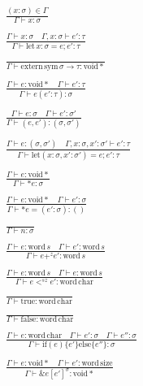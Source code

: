 \documentclass {article}
\begin{document}
\begin{gather*}
\frac
{(x : \sigma) \in \Gamma}
{\Gamma \vdash x : \sigma} \\
\\
\frac
{\Gamma \vdash x : \sigma \quad \Gamma, x : \sigma \vdash e' : \tau }
{\Gamma \vdash \text{let} \, x : \sigma = e; e' : \tau} \\
\\
\frac
{}
{\Gamma \vdash \text{extern} \, \text{sym} \, \sigma \to \tau : \text{void} *} \\
\\
\frac
{\Gamma \vdash e : \text{void} * \quad \Gamma \vdash e' : \tau}
{\Gamma \vdash e(e' : \tau) : \sigma} \\
\\
\frac
{\Gamma \vdash e : \sigma \quad \Gamma \vdash e' : \sigma'}
{\Gamma \vdash (e, e') : (\sigma, \sigma') } \\
\\
\frac
{\Gamma \vdash e : (\sigma, \sigma') \quad \Gamma, x : \sigma, x' : \sigma' \vdash e' : \tau}
{\Gamma \vdash \text{let} (x: \sigma, x' : \sigma') = e; e' : \tau} \\
\\
\frac
{\Gamma \vdash e : \text{void} *}
{\Gamma \vdash * e : \sigma} \\
\\
\frac {\Gamma \vdash e : \text{void} * \quad \Gamma \vdash e' : \sigma}
{\Gamma \vdash *e = (e' : \sigma) : ()} \\
\\
\frac
{}
{\Gamma \vdash n : \sigma} \\
\\
\frac
{\Gamma \vdash e : \text{word} \, s \quad \Gamma \vdash e' : \text{word} \, s }
{\Gamma \vdash e +^z e' : \text{word} \, s} \\
\\
\frac
{\Gamma \vdash e : \text{word} \, s \quad \Gamma \vdash e : \text{word} \, s}
{\Gamma \vdash e <^{sz} e' : \text{word} \, \text{char}} \\
\\
\frac
{}
{\Gamma \vdash \text{true} : \text{word} \, \text{char}} \\
\\
\frac
{}
{\Gamma \vdash \text{false} : \text{word} \, \text{char}} \\
\\
\frac
{\Gamma \vdash  e : \text{word} \, \text{char} \quad \Gamma \vdash e' : \sigma \quad \Gamma \vdash e'' : \sigma }
{\Gamma \vdash \text{if} (e) \{ e'\} \text{else} \{e''\} : \sigma} \\
\\
\frac
{\Gamma \vdash e : \text{void}* \quad \Gamma \vdash e' : \text{word} \, \text{size}}
{\Gamma \vdash \& e [e']^\sigma : \text{void}*} \\
\end{gather*}
\end{document}
